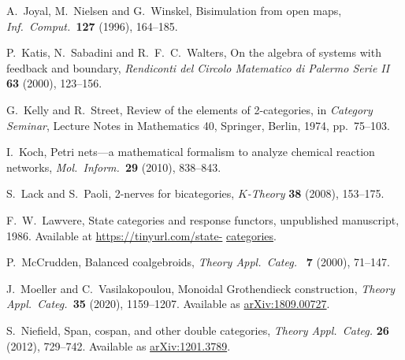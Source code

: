\documentclass[reqno]{amsart}
\begin{document}
\begin{thebibliography}{100}
 A.\ Joyal, M.\ Nielsen and G.\ Winskel, Bisimulation from open maps, \textsl{Inf.\ Comput.\ }\textbf{127} (1996), 164--185.

 P.\ Katis, N.\ Sabadini and R.\ F.\ C.\ Walters, On the algebra of systems with feedback and boundary, \textsl{Rendiconti del Circolo Matematico di Palermo Serie II} \textbf{63} (2000), 123--156.

 G.\ Kelly and R.\ Street, Review of the elements of 2-categories, in \textsl{Category Seminar}, Lecture Notes in Mathematics 40, Springer, Berlin, 1974, 
pp.\ 75--103.

 I.\ Koch, Petri nets---a mathematical formalism to analyze chemical reaction
networks, \textsl{Mol.\ Inform.\  }\textbf{29} (2010), 838--843.

 S.\ Lack and S.\ Paoli, 2-nerves for bicategories, \textsl{$K$-Theory} \textbf{38} (2008), 153--175.

 F.\ W.\ Lawvere, State categories and response functors, unpublished manuscript, 1986.  Available at \href{https://tinyurl.com/state}{https://tinyurl.com/state-}  \href{https://tinyurl.com/state-categories}{categories}.





 P.\ McCrudden, Balanced coalgebroids, \textsl{Theory Appl.\ Categ.\ } \textbf{7} (2000), 71--147.

 J.\ Moeller and C.\ Vasilakopoulou, Monoidal Grothendieck construction, \textsl{Theory Appl.\ Categ.\ }\textbf{35} (2020), 1159--1207. Available as \href{https://arxiv.org/abs/1809.00727}{arXiv:1809.00727}.

 S.~Niefield, Span, cospan, and other double categories, \textsl{Theory Appl.\ Categ.} \textbf{26} (2012), 729--742. Available as \href{https://arxiv.org/abs/1201.3789}{arXiv:1201.3789}.


\end{thebibliography}
\end{document}
